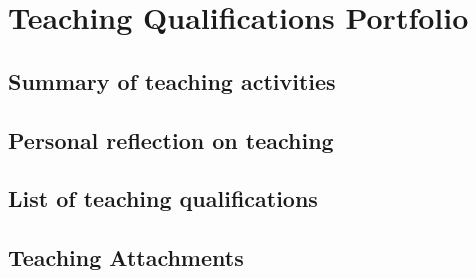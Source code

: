 \chapter{Teaching Qualifications Portfolio}

\section{Summary of teaching activities} \label{sec:summary-of-teaching-activities}

\section{Personal reflection on teaching} \label{sec:personal-reflection-on-teaching}

\section{List of teaching qualifications} \label{sec:list-of-teaching-qualifications}

\section{Teaching Attachments} \label{sec:teaching-attachments}
